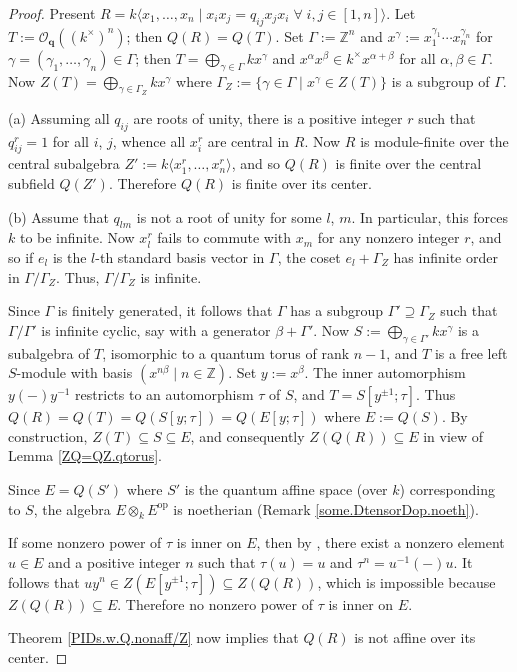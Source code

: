 \documentclass{conm-p-l}
\theoremstyle{definition}
\theoremstyle{remark}
\numberwithin{equation}{section}
\newcommand{\ZZ}{\mathbb{Z}}
\newcommand \calO {{\mathcal{O}}}
\newcommand\bfq{\boldsymbol{q}}
\DeclareMathOperator{\op}{op}
\newcommand\Obfq{\calO_{\bfq}}
\begin{document}
\begin{proof}
Present $R =  k\langle x_1,\dots,x_n \mid x_ix_j = q_{ij} x_jx_i \; \forall\; i,j \in [1,n] \rangle$.  Let $T := \Obfq((k^\times)^n)$; then $Q(R) = Q(T)$.
Set $\Gamma := \ZZ^n$ and $x^\gamma := x_1^{\gamma_1} \cdots x_n^{\gamma_n}$ for $\gamma = (\gamma_1,\dots,\gamma_n) \in \Gamma$; then $T = \bigoplus_{\gamma\in\Gamma} k x^\gamma$ and $x^\alpha x^\beta \in k^\times x^{\alpha+\beta}$ for all $\alpha,\beta \in \Gamma$.  Now $Z(T) = \bigoplus_{\gamma\in\Gamma_Z} k x^\gamma$ where $\Gamma_Z := \{ \gamma \in \Gamma \mid x^\gamma \in Z(T) \}$ is a subgroup of $\Gamma$. 

(a)  Assuming all $q_{ij}$ are roots of unity, there is a positive integer $r$ such that $q_{ij}^r = 1$ for all $i$, $j$, whence all $x_i^r$ are central in $R$.  Now $R$ is module-finite over the central subalgebra $Z' := k\langle x_1^r,\dots,x_n^r \rangle$, and so $Q(R)$ is finite over the central subfield $Q(Z')$.  Therefore $Q(R)$ is finite over its center.

(b) Assume that $q_{lm}$ is not a root of unity for some $l$, $m$.  In particular, this forces $k$ to be infinite.  Now $x_l^r$ fails to commute with $x_m$ for any nonzero integer $r$, and so if $e_l$ is the $l$-th standard basis vector in $\Gamma$, the coset $e_l + \Gamma_Z$ has infinite order in $\Gamma/\Gamma_Z$.  Thus, $\Gamma/\Gamma_Z$ is infinite.

Since $\Gamma$ is finitely generated, it follows that $\Gamma$ has a subgroup $\Gamma' \supseteq \Gamma_Z$ such that $\Gamma/\Gamma'$ is infinite cyclic, say with a generator $\beta+\Gamma'$.  Now $S := \bigoplus_{\gamma\in\Gamma'} k x^\gamma$ is a subalgebra of $T$, isomorphic to a quantum torus of rank $n-1$, and $T$ is a free left $S$-module with basis $(x^{n\beta} \mid n\in \ZZ)$.  Set $y := x^{\beta}$.  The inner automorphism $y(-)y^{-1}$ restricts to an automorphism $\tau$ of $S$, and $T = S[y^{\pm1};\tau]$.  Thus $Q(R) = Q(T) = Q(S[y;\tau]) = Q(E[y;\tau])$ where $E := Q(S)$.  By construction, $Z(T) \subseteq S \subseteq E$, and consequently $Z(Q(R)) \subseteq E$ in view of Lemma \ref{ZQ=QZ.qtorus}.

Since $E = Q(S')$ where $S'$ is the quantum affine space (over $k$) corresponding to $S$, the algebra $E \otimes_k E^{\op}$ is noetherian (Remark \ref{some.DtensorDop.noeth}).  

If some nonzero power of $\tau$ is inner on $E$, then  by \cite[Theorems 0,1]{Jor}, there exist a nonzero element $u \in E$ and a positive integer $n$ such that $\tau(u) = u$ and $\tau^n = u^{-1}(-)u$.  It follows that $uy^n \in Z(E[y^{\pm1};\tau]) \subseteq Z(Q(R))$, which is impossible because $Z(Q(R)) \subseteq E$. Therefore no nonzero power of $\tau$ is inner on $E$.

Theorem \ref{PIDs.w.Q.nonaff/Z} now implies that $Q(R)$ is not affine over its center.
\end{proof}
\end{document}
